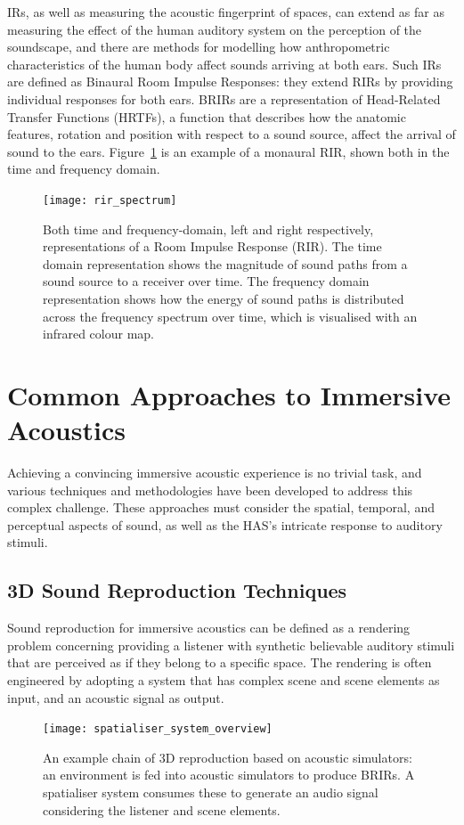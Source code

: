 IRs, as well as measuring the acoustic fingerprint of spaces, can extend as far as measuring the effect of the human auditory system on the perception of the soundscape, and there are methods for modelling how anthropometric characteristics of the human body affect sounds arriving at both ears. Such IRs are defined as Binaural Room Impulse Responses: they extend RIRs by providing individual responses for both ears. BRIRs are a representation of Head-Related Transfer Functions (HRTFs), a function that describes how the anatomic features, rotation and position with respect to a sound source, affect the arrival of sound to the ears. Figure~\ref{fig:rir-spectrum} is an example of a monaural RIR, shown both in the time and frequency domain. 
\begin{figure}
    \centering
    \texttt{[image: rir\_spectrum]}
    \caption{Both time and frequency-domain, left and right respectively, representations of a Room Impulse Response (RIR). The time domain representation shows the magnitude of sound paths from a sound source to a receiver over time. The frequency domain representation shows how the energy of sound paths is distributed across the frequency spectrum over time, which is visualised with an infrared colour map.}
    \label{fig:rir-spectrum}
\end{figure}

\section{Common Approaches to Immersive Acoustics}
Achieving a convincing immersive acoustic experience is no trivial task, and various techniques and methodologies have been developed to address this complex challenge. These approaches must consider the spatial, temporal, and perceptual aspects of sound, as well as the HAS's intricate response to auditory stimuli.

\subsection{3D Sound Reproduction Techniques}
Sound reproduction for immersive acoustics can be defined as a rendering problem concerning providing a listener with synthetic believable auditory stimuli that are perceived as if they belong to a specific space. The rendering is often engineered by adopting a system that has complex scene and scene elements as input, and an acoustic signal as output. 
\begin{figure}
    \centering
    \texttt{[image: spatialiser\_system\_overview]}
    \caption{An example chain of 3D reproduction based on acoustic simulators: an environment is fed into acoustic simulators to produce BRIRs. A spatialiser system consumes these to generate an audio signal considering the listener and scene elements.}
    \label{fig:spatialiser-overview}
\end{figure}

